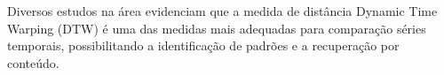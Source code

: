 Diversos estudos na área evidenciam que a medida de distância Dynamic Time Warping (DTW) é uma das medidas mais adequadas para comparação séries temporais, possibilitando a identificação de padrões e a recuperação por conteúdo. \cite{ratanamahatana2004} \cite{alon2009} \cite{Berndt:1994:UDT:3000850.3000887}


